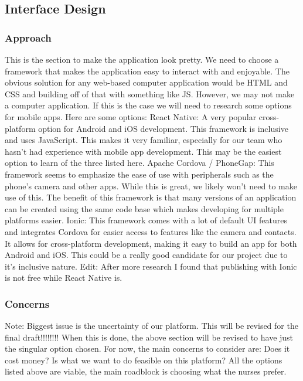 \documentclass[onecolumn, draftclsnofoot,10pt, compsoc]{IEEEtran}
\begin{document}
\subsection{Interface Design}
\subsubsection{Approach}
This is the section to make the application look pretty. We need to choose a framework that makes the application easy to interact with and enjoyable.
\newline
The obvious solution for any web-based computer application would be HTML and CSS and building off of that with something like JS. However, we may not make a computer application. If this is the case we will need to research some options for mobile apps. Here are some options:
\newline
\newline
React Native: 
A very popular cross-platform option for Android and iOS development. This framework is inclusive and uses JavaScript. This makes it very familiar, especially for our team who hasn't had experience with mobile app development. This may be the easiest option to learn of the three listed here.
\newline
\newline
Apache Cordova / PhoneGap: 
This framework seems to emphasize the ease of use with peripherals such as the phone's camera and other apps. While this is great, we likely won't need to make use of this. The benefit of this framework is that many versions of an application can be created using the same code base which makes developing for multiple platforms easier.
\newline
\newline
Ionic: 
This framework comes with a lot of default UI features and integrates Cordova for easier access to features like the camera and contacts. It allows for cross-platform development, making it easy to build an app for both Android and iOS. This could be a really good candidate for our project due to it's inclusive nature. 
\newline
\newline Edit: After more research I found that publishing with Ionic is not free while React Native is. 
\subsubsection{Concerns}
Note: Biggest issue is the uncertainty of our platform. This will be revised for the final draft!!!!!!!! When this is done, the above section will be revised to have just the singular option chosen.
\newline
For now, the main concerns to consider are: Does it cost money? Is what we want to do feasible on this platform? All the options listed above are viable, the main roadblock is choosing what the nurses prefer.
\end{document}
